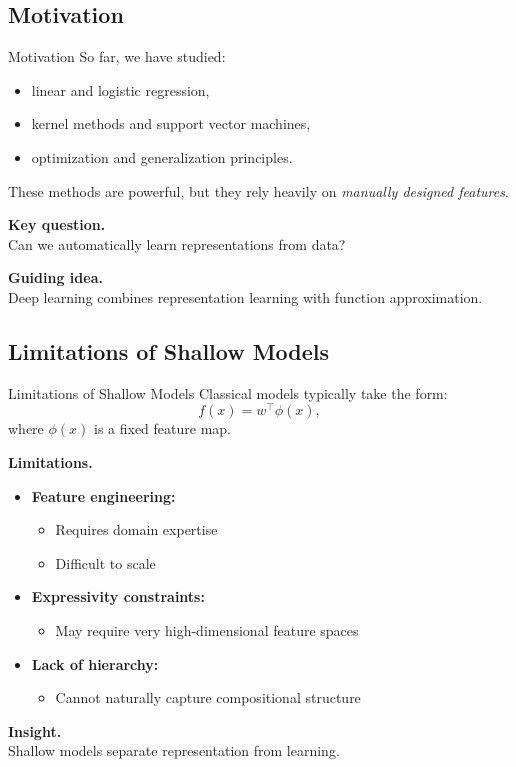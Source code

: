 \documentclass[aspectratio=169,11pt]{beamer}
\begin{document}
\subsection{Motivation}
\begin{frame}[t,allowframebreaks]{Motivation}
\small
So far, we have studied:

\begin{itemize}
    \item linear and logistic regression,
    \item kernel methods and support vector machines,
    \item optimization and generalization principles.
\end{itemize}

These methods are powerful, but they rely heavily on \emph{manually designed features}.

\textbf{Key question.}\\ Can we automatically learn representations from data?

\textbf{Guiding idea.}\\ Deep learning combines representation learning with function approximation.
\end{frame}

\subsection{Limitations of Shallow Models}
\begin{frame}[t,allowframebreaks]{Limitations of Shallow Models}
\small
Classical models typically take the form:
\[
f(x) = w^\top \phi(x),
\]
where $\phi(x)$ is a fixed feature map.

\textbf{Limitations.}\\ \begin{itemize}
    \item \textbf{Feature engineering:}\\ \begin{itemize}
        \item Requires domain expertise
        \item Difficult to scale
    \end{itemize}

    \item \textbf{Expressivity constraints:}\\ \begin{itemize}
        \item May require very high-dimensional feature spaces
    \end{itemize}

    \item \textbf{Lack of hierarchy:}\\ \begin{itemize}
        \item Cannot naturally capture compositional structure
    \end{itemize}
\end{itemize}

\textbf{Insight.}\\ Shallow models separate representation from learning.
\end{frame}
\end{document}
